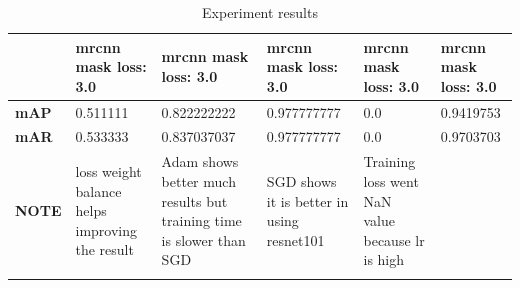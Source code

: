 \begin{longtable}[c]{|p{}|p{}|p{}|p{}|p{}|p{}|}
		& mrcnn mask loss: 3.0 & mrcnn mask loss: 3.0 & mrcnn mask loss: 3.0 & mrcnn mask loss: 3.0 & mrcnn mask loss: 3.0 \\ \hline
		
		\textbf{mAP} & 0.511111 & 0.822222222 & 0.977777777 & 0.0 & 0.9419753 \\ \hline
		\textbf{mAR} & 0.533333 & 0.837037037 & 0.977777777 & 0.0 & 0.9703703 \\ \hline
		\textbf{NOTE} & loss weight balance helps improving the result & Adam shows better much results but training time is slower than SGD & SGD shows it is better in using resnet101 & Training loss went NaN value because lr is high &  \\ \hline
		
		\caption{Experiment results}
		\label{table:exp1}
	\end{longtable}

